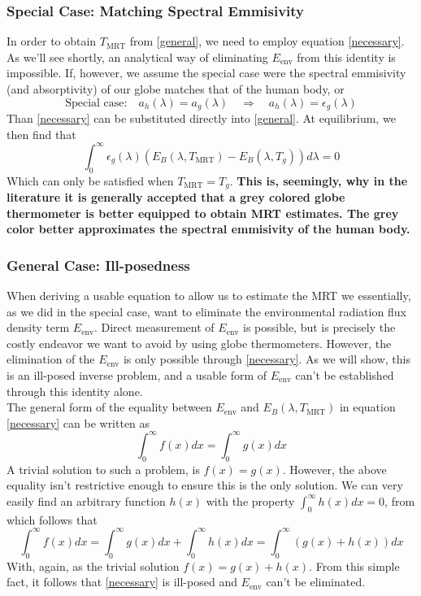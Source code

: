 \documentclass[]{scrartcl}
\begin{document}
\subsubsection{Special Case: Matching Spectral Emmisivity}
In order to obtain $T_{\text{MRT}}$ from \eqref{general}, we need to employ equation \eqref{necessary}. As we'll see shortly, an analytical way of eliminating $E_{\text{env}}$ from this identity is impossible. If, however, we assume the special case were the spectral emmisivity (and absorptivity) of our globe matches that of the human body, or
$$
\text{Special case:} \quad a_h(\lambda) = a_g(\lambda) \quad \Longrightarrow\quad a_h(\lambda) = \epsilon_g(\lambda)
$$ 
Than \eqref{necessary} can be substituted directly into \eqref{general}. At equilibrium, we then find that
\begin{equation}
	\boxed{\int_{0}^{\infty}\epsilon_g(\lambda)\left(E_{B}(\lambda, T_{\text{MRT}}) - E_B(\lambda, T_g)\right)d\lambda = 0}
\end{equation}
Which can only be satisfied when $T_{\text{MRT}} = T_{g}$. \textbf{This is, seemingly, why in the literature it is generally accepted that a grey colored globe thermometer is better equipped to obtain MRT estimates. The grey color better approximates the spectral emmisivity of the human body.}  
\subsubsection{General Case: Ill-posedness}
When deriving a usable equation to allow us to estimate the MRT we essentially, as we did in the special case, want to eliminate the environmental radiation flux density term $E_{\text{env}}$. Direct measurement of $E_{\text{env}}$ is possible, but is precisely the costly endeavor we want to avoid by using globe thermometers. However, the elimination of the $E_{\text{env}}$ is only possible through \eqref{necessary}. As we will show, this is an ill-posed inverse problem, and a usable form of $E_{\text{env}}$ can't be established through this identity alone.
\\

The general form of the equality between $E_{\text{env}}$ and $E_B(\lambda, T_{\text{MRT}})$ in equation \eqref{necessary} can be written as
$$
\int_{0}^{\infty}f(x)dx = \int_{0}^{\infty}g(x)dx
$$
A trivial solution to such a problem, is $f(x)=g(x)$. However, the above equality isn't restrictive enough to ensure this is the only solution. We can very easily find an arbitrary function $h(x)$ with the property $\int_{0}^{\infty}h(x)dx=0$, from which follows that
$$
\int_{0}^{\infty}f(x)dx = \int_{0}^{\infty}g(x)dx + \int_{0}^{\infty}h(x)dx = \int_{0}^\infty\left(g(x) + h(x)\right)dx
$$
With, again, as the trivial solution $f(x) = g(x) + h(x)$. From this simple fact, it follows that \eqref{necessary} is ill-posed and $E_{\text{env}}$ can't be eliminated. 
\end{document}
